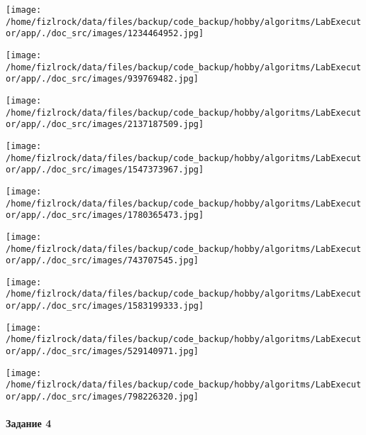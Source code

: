 \documentclass[a4paper, 12pt]{article}
\begin{document}
\texttt{[image: /home/fizlrock/data/files/backup/code\_backup/hobby/algoritms/LabExecutor/app/./doc\_src/images/1234464952.jpg]}

\texttt{[image: /home/fizlrock/data/files/backup/code\_backup/hobby/algoritms/LabExecutor/app/./doc\_src/images/939769482.jpg]}

\texttt{[image: /home/fizlrock/data/files/backup/code\_backup/hobby/algoritms/LabExecutor/app/./doc\_src/images/2137187509.jpg]}

\texttt{[image: /home/fizlrock/data/files/backup/code\_backup/hobby/algoritms/LabExecutor/app/./doc\_src/images/1547373967.jpg]}

\texttt{[image: /home/fizlrock/data/files/backup/code\_backup/hobby/algoritms/LabExecutor/app/./doc\_src/images/1780365473.jpg]}

\texttt{[image: /home/fizlrock/data/files/backup/code\_backup/hobby/algoritms/LabExecutor/app/./doc\_src/images/743707545.jpg]}

\texttt{[image: /home/fizlrock/data/files/backup/code\_backup/hobby/algoritms/LabExecutor/app/./doc\_src/images/1583199333.jpg]}

\texttt{[image: /home/fizlrock/data/files/backup/code\_backup/hobby/algoritms/LabExecutor/app/./doc\_src/images/529140971.jpg]}

\texttt{[image: /home/fizlrock/data/files/backup/code\_backup/hobby/algoritms/LabExecutor/app/./doc\_src/images/798226320.jpg]}
\pagebreak
\paragraph{Задание 4}
\end{document}
